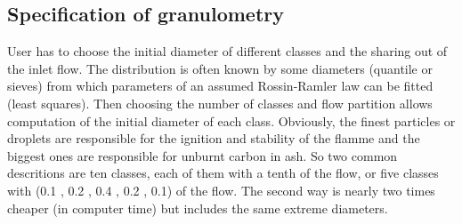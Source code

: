 \subsection{Specification of granulometry}

User has to choose the initial diameter of different classes and the sharing out
of the inlet flow. The distribution is often known by some diameters (quantile
or sieves) from which parameters of an assumed Rossin-Ramler law can be fitted
(least squares). Then choosing the number of classes and flow partition allows
computation of the initial diameter of each class. Obviously, the finest
particles or droplets are responsible for the ignition and stability of the
flamme and the biggest ones are responsible for unburnt carbon in ash. So two
common descritions are ten classes, each of them with a tenth of the flow, or
five classes with (0.1 , 0.2 , 0.4 , 0.2 , 0.1) of the flow. The second way is
nearly two times cheaper (in computer time) but includes the same extreme
diameters. 

